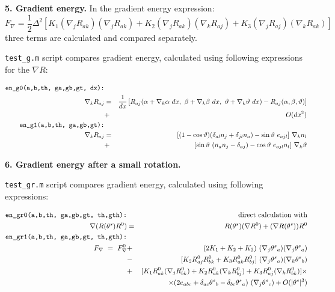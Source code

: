 \documentclass[a4paper]{article}
\def\ts{{\theta^s}}
\def\ct{\cos\vartheta}
\def\st{\sin\vartheta}
\begin{document}
{\bf 5. Gradient energy.} In the gradient energy expression:
$$
F_\nabla \label{eq:He3_en_g}
= \frac12 \Delta^2 \left[
  K_1 (\nabla_j R_{ak})(\nabla_j R_{ak})
+ K_2 (\nabla_j R_{ak})(\nabla_k R_{aj})
+ K_3 (\nabla_j R_{aj})(\nabla_k R_{ak}) \right]
$$
three terms are calculated and compared separately.

{\tt test\_g.m} script compares gradient energy, calculated using following
expressions for the $\nabla R$:

\begin{eqnarray*}
\mbox{\tt en\_g0(a,b,th, ga,gb,gt, dx):} &&\\
\nabla_k R_{aj} &=&
\frac{1}{dx}\left[
R_{aj}(\alpha+\nabla_k\alpha\ dx,\ \beta+\nabla_k\beta\ dx,\ \vartheta+\nabla_k\vartheta\ dx) -
R_{aj}(\alpha, \beta, \vartheta)\right]\\
&+& O(dx^2)
\\
\mbox{\tt en\_g1(a,b,th, ga,gb,gt):} &&\\
\nabla_k R_{aj} &=&
 [(1-\ct)(\delta_{al} n_j + \delta_{jl} n_a) - \st\ e_{ajl}]\ \nabla_k n_l\\
&+& [\st\ (n_a n_j - \delta_{aj}) - \ct\ e_{ajl} n_l]\ \nabla_k \vartheta
\end{eqnarray*}

{\bf 6. Gradient energy after a small rotation.} 

{\tt test\_gr.m} script compares gradient energy, calculated using following
expressions:

\begin{eqnarray*}
\mbox{\tt en\_gr0(a,b,th, ga,gb,gt, th,gth):} &&\mbox{direct calculation with} \\
\nabla (R(\ts) R^0) &=& R(\ts) (\nabla R^0) + (\nabla R(\ts)) R^0
\\
\mbox{\tt en\_gr1(a,b,th, ga,gb,gt, th,gth):} &&\\
   F_\nabla\ =\ F_\nabla^0
&+& (2K_1+K_2+K_3)
\ (\nabla_j \ts_a) (\nabla_j \ts_a)\\
&-& [K_2 R^0_{aj} R^0_{bk} + K_3 R^0_{ak} R^0_{bj}]
\ (\nabla_j \ts_a) (\nabla_k \ts_b)\\
&+& [K_1 R^0_{ak} (\nabla_j R^0_{bk}) + K_2 R^0_{ak} (\nabla_k R^0_{bj})
   + K_3 R^0_{aj} (\nabla_k R^0_{bk})]\times\\
&&\times(2e_{abc} + \delta_{ac}\ts_b - \delta_{bc}\ts_a)\ (\nabla_j \ts_c) + O(|\ts|^3)
\end{eqnarray*}



%
\end{document}

